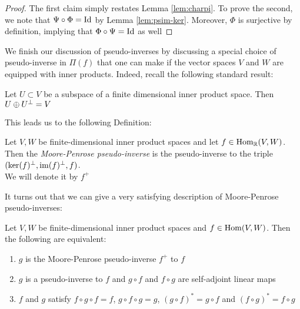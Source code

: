 \begin{proof}
	The first claim simply restates Lemma \ref{lem:charpi}. To prove the second, we note that $\Psi\circ \Phi=\operatorname{Id}$  by Lemma \ref{lem:psim-ker}. Moreover, $\Phi$ is surjective by definition, implying that $\Phi\circ \Psi =\operatorname{Id}$ as well
\end{proof}



\noindent We finish our discussion of pseudo-inverses by discussing a special choice of pseudo-inverse in $\Pi(f)$ that one can make if the vector spaces $V$ and $W$ are equipped with inner products. Indeed, recall the following standard result:

\begin{lemma}
 Let $U \subset V$ be a subspace of a finite dimensional inner product space. Then $U\oplus U^{\perp}=V$
\end{lemma}

This leads us to the following Definition:
\begin{definition}\label{def:mpinverse}
Let $V,W$ be finite-dimensional inner product spaces and let $f \in \operatorname{Hom}_{\mathbb{R}}(V,W)$. Then the \emph{Moore-Penrose pseudo-inverse} is the pseudo-inverse to the triple $(\ker(f)^\perp,\operatorname{im}(f)^\perp,f)$.\\ We will denote it by $f^+$
\end{definition}

\noindent It turns out that we can give a very satisfying description of Moore-Penrose pseudo-inverses:

\begin{lemma}\label{lem:mppschar}
	Let $V, W$ be finite-dimensional inner product spaces and $f \in \operatorname{Hom}(V,W)$. Then the following are equivalent:
	\begin{enumerate}
		\item $g$ is the Moore-Penrose pseudo-inverse $f^+$ to $f$
		\item $g$ is a pseudo-inverse to $f$ and $g\circ f$ and $f \circ g$ are self-adjoint linear maps
		\item $f$ and $g$ satisfy $f\circ g \circ f=f$, $g\circ f\circ g =g$,  $(g\circ f)^*=g\circ f$ and $(f\circ g)^* =f\circ g$
	\end{enumerate}
\end{lemma}

